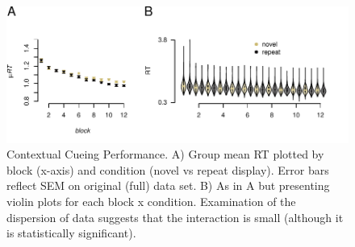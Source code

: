 \documentclass{article}
\begin{document}
\begin{figure}

{\centering \includegraphics[width=0.9\linewidth]{../images/CC_behav} 

}

\caption{Contextual Cueing Performance. A) Group mean RT plotted by block (x-axis) and condition (novel vs repeat display). Error bars reflect SEM on original (full) data set. B) As in A but presenting violin plots for each block x condition. Examination of the dispersion of data suggests that the interaction is small (although it is statistically significant).}\label{fig:CCbeh}
\end{figure}
\end{document}
